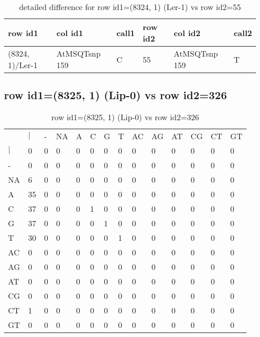 \begin{center}
\begin{longtable}{|l|l|l|l|l|l|}
\caption{detailed difference for row id1=(8324, 1) (Ler-1) vs row id2=55} \label{table_dm321}\\
\hline
row id1&col id1&call1&row id2&col id2&call2\\
\hline
(8324, 1)/Ler-1&AtMSQTsnp 159&C&55&AtMSQTsnp 159&T\\
\hline
\end{longtable}
\end{center}

\subsection{row id1=(8325, 1) (Lip-0) vs row id2=326}
\begin{center}
\begin{longtable}{|l|l|l|l|l|l|l|l|l|l|l|l|l|l|}
\caption{row id1=(8325, 1) (Lip-0) vs row id2=326} \label{table_dm322}\\
\hline
\\
\hline
&$|$&-&NA&A&C&G&T&AC&AG&AT&CG&CT&GT\\
$|$&0&0&0&0&0&0&0&0&0&0&0&0&0\\
-&0&0&0&0&0&0&0&0&0&0&0&0&0\\
NA&6&0&0&0&0&0&0&0&0&0&0&0&0\\
A&35&0&0&0&0&0&0&0&0&0&0&0&0\\
C&37&0&0&0&1&0&0&0&0&0&0&0&0\\
G&37&0&0&0&0&1&0&0&0&0&0&0&0\\
T&30&0&0&0&0&0&1&0&0&0&0&0&0\\
AC&0&0&0&0&0&0&0&0&0&0&0&0&0\\
AG&0&0&0&0&0&0&0&0&0&0&0&0&0\\
AT&0&0&0&0&0&0&0&0&0&0&0&0&0\\
CG&0&0&0&0&0&0&0&0&0&0&0&0&0\\
CT&1&0&0&0&0&0&0&0&0&0&0&0&0\\
GT&0&0&0&0&0&0&0&0&0&0&0&0&0\\
\hline
\end{longtable}
\end{center}

